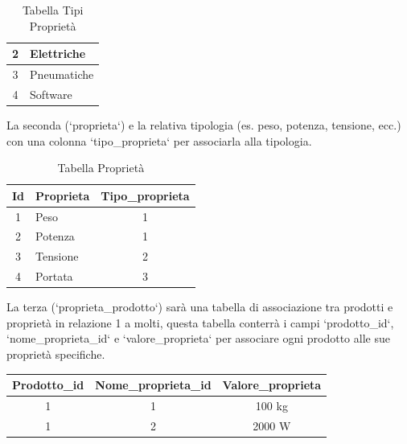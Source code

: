 \documentclass[12pt, a4paper]{article}
\begin{document}
\begin{itemize}
\begin{table}[h!]
\begin{tabular}{|c|l|}
                  2           & Elettriche               \\ \hline
                  3           & Pneumatiche              \\ \hline
                  4           & Software                 \\ \hline
              \end{tabular}
              \vspace{0.5cm}
              \caption{Tabella Tipi Proprietà}
          \end{table}
          La seconda (`proprieta`) e la relativa tipologia (es. peso, potenza, tensione, ecc.) con una colonna `tipo\_proprieta` per associarla alla tipologia.
          \begin{table}[h!]
              \centering
              \begin{tabular}{|c|l|c|}
                  \hline
                  \textbf{Id} & \textbf{Proprieta} & \textbf{Tipo\_proprieta} \\ \hline
                  1           & Peso               & 1                        \\ \hline
                  2           & Potenza            & 1                        \\ \hline
                  3           & Tensione           & 2                        \\ \hline
                  4           & Portata            & 3                        \\ \hline
              \end{tabular}
              \vspace{0.5cm}
              \caption{Tabella Proprietà}
          \end{table}
          La terza (`proprieta\_prodotto`) sarà una tabella di associazione tra prodotti e proprietà in relazione 1 a molti, questa tabella conterrà i campi `prodotto\_id`,
          `nome\_proprieta\_id` e `valore\_proprieta` per associare ogni prodotto alle sue proprietà specifiche.
          \begin{table}[H]
              \centering
              \begin{tabular}{|c|c|c|}
                  \hline
                  \textbf{Prodotto\_id} & \textbf{Nome\_proprieta\_id} & \textbf{Valore\_proprieta} \\ \hline
                  1                     & 1                            & 100 kg                     \\ \hline
                  1                     & 2                            & 2000 W                     \\ \hline

\end{tabular}
\end{table}
\end{itemize}
\end{document}
